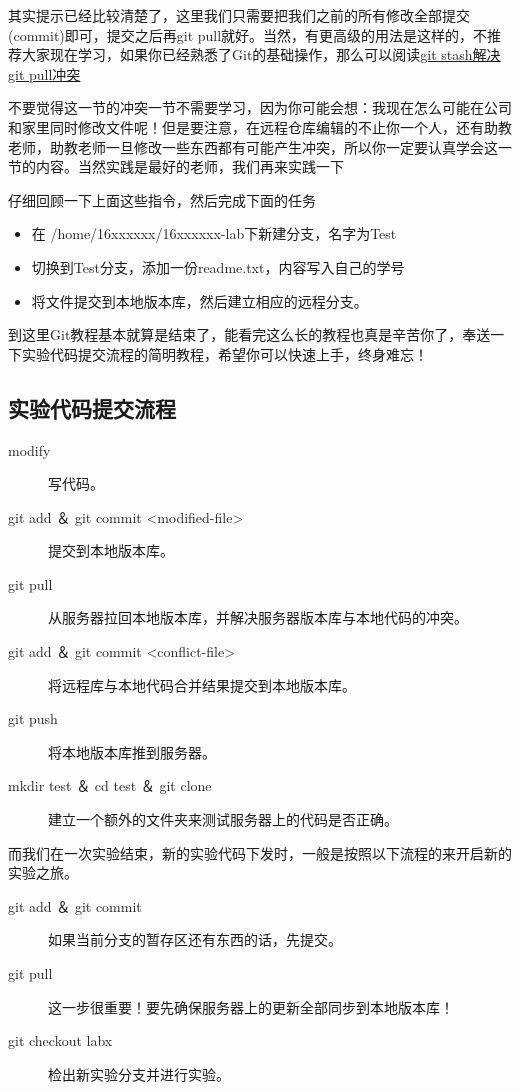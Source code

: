 其实提示已经比较清楚了，这里我们只需要把我们之前的所有修改全部提交(commit)即可，提交之后再git pull就好。当然，有更高级的用法是这样的，不推荐大家现在学习，如果你已经熟悉了Git的基础操作，那么可以阅读\href{http://www.01happy.com/git-resolve-conflicts/}{git stash解决git pull冲突}

不要觉得这一节的冲突一节不需要学习，因为你可能会想：我现在怎么可能在公司和家里同时修改文件呢！但是要注意，在远程仓库编辑的不止你一个人，还有助教老师，助教老师一旦修改一些东西都有可能产生冲突，所以你一定要认真学会这一节的内容。当然实践是最好的老师，我们再来实践一下

\begin{exercise}
仔细回顾一下上面这些指令，然后完成下面的任务
  \begin{itemize}
    \item 在 /home/16xxxxxx/16xxxxxx-lab下新建分支，名字为Test
    \item 切换到Test分支，添加一份readme.txt，内容写入自己的学号
    \item 将文件提交到本地版本库，然后建立相应的远程分支。
  \end{itemize}
\end{exercise}

到这里Git教程基本就算是结束了，能看完这么长的教程也真是辛苦你了，奉送一下实验代码提交流程的简明教程，希望你可以快速上手，终身难忘！

\subsection{实验代码提交流程}

\begin{description}
\item[modify] 写代码。
\item[git add ＆ git commit <modified-file>] 提交到本地版本库。
\item[git pull] 从服务器拉回本地版本库，并解决服务器版本库与本地代码的冲突。
\item[git add ＆ git commit <conflict-file>] 将远程库与本地代码合并结果提交到本地版本库。
\item[git push] 将本地版本库推到服务器。
\item[mkdir test ＆ cd test ＆ git clone] 建立一个额外的文件夹来测试服务器上的代码是否正确。
\end{description}

而我们在一次实验结束，新的实验代码下发时，一般是按照以下流程的来开启新的实验之旅。

\begin{description}
\item[git add ＆ git commit] 如果当前分支的暂存区还有东西的话，先提交。
\item[git pull] 这一步很重要！要先确保服务器上的更新全部同步到本地版本库！
\item[git checkout labx] 检出新实验分支并进行实验。
\end{description}

